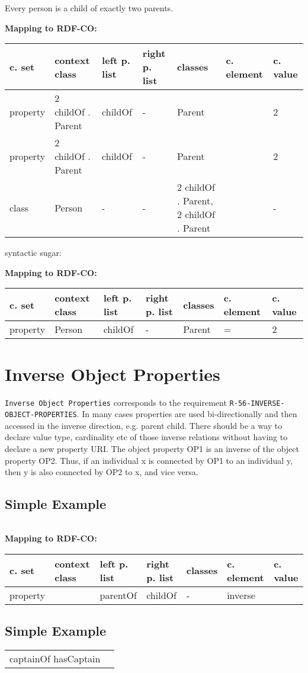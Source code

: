 \documentclass{llncs}
\newcommand{\ms}[1]{\texttt{#1}}
\newenvironment{gcotable}{
  \scriptsize
  \sffamily
  \vspace{0cm}
	\begin{center}
	\textbf{\vspace{0.4cm}Mapping to RDF-CO:} \\
  \begin{tabular}{l|l|l|l|l|l|l}
	\hline
  \textbf{c. set} & \textbf{context class} & \textbf{left p. list} & \textbf{right p. list} & \textbf{classes} & \textbf{c. element} & \textbf{c. value} \\
  \hline

}{
  \hline
  \end{tabular}
	\end{center}
}
\newenvironment{DL}{
\vspace{0cm}
	\begin{center}
  \begin{tabular}{r l}

}{
  \end{tabular}
	\end{center}
}
\begin{document}
Every person is a child of exactly two parents.

\begin{gcotable}
property &  2 childOf . Parent & childOf & - & Parent &  & 2 \\
property &  2 childOf . Parent & childOf & - & Parent &  & 2 \\
class & Person & - & - &  2 childOf . Parent,  2 childOf . Parent &  & - \\
\end{gcotable}

syntactic sugar:

\begin{gcotable}
property & Person & childOf & - & Parent & = & 2 \\
\end{gcotable}

\section{Inverse Object Properties}

\ms{Inverse Object Properties} corresponds to the requirement
\ms{R-56-INVERSE-} \ms{OBJECT-PROPERTIES}.
In many cases properties are used bi-directionally and then accessed in the inverse direction, e.g. parent  child. There should be a way to declare value type, cardinality etc of those inverse relations without having to declare a new property URI. 
The object property OP1 is an inverse of the object property OP2. 
Thus, if an individual x is connected by OP1 to an individual y, then y is also connected by OP2 to x, and vice versa.

\subsection{Simple Example}

\begin{DL}
 \\
\end{DL}

\begin{gcotable}
property &  & parentOf & childOf & - & inverse \\
\end{gcotable}


\subsection{Simple Example}

\begin{DL}
captainOf  hasCaptain \\
\end{DL}
\end{document}
